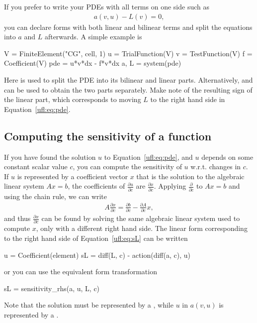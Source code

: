 If you prefer to write your PDEs with all terms on one side such as
\begin{align}\label{ufl:eq:pde}
a(v, u) - L(v) = 0,
\end{align}
you can declare forms with both linear and bilinear terms
and split the equations into $a$ and $L$ afterwards.
A simple example is
\begin{python}
V = FiniteElement("CG", cell, 1)
u = TrialFunction(V)
v = TestFunction(V)
f = Coefficient(V)
pde = u*v*dx - f*v*dx
a, L = system(pde)
\end{python}
Here  is used to split the PDE into its bilinear and
linear parts. Alternatively,  and  can be used
to obtain the two parts separately. Make note of the resulting sign
of the linear part, which corresponds to moving $L$ to the right
hand side in Equation~\eqref{ufl:eq:pde}.

\subsection{Computing the sensitivity of a function} \label{ufl:sec:sensitivity}
If you have found the solution $u$ to Equation~\eqref{ufl:eq:pde}, and
$u$ depends on some constant scalar value $c$, you can compute the
sensitivity of $u$ w.r.t. changes in $c$.  If $u$ is represented by a
coefficient vector $x$ that is the solution to the algebraic linear
system $A x = b$, the coefficients of $\frac{\partial u}{\partial c}$
are $\frac{\partial x}{\partial c}$.  Applying $\frac{\partial
}{\partial c}$ to $A x = b$ and using the chain rule, we can write
\begin{align}\label{ufl:eq:sL}
A \frac{\partial x}{\partial c} = \frac{\partial b}{\partial c} - \frac{\partial A}{\partial c} x,
\end{align}
and thus $\frac{\partial x}{\partial c}$ can be found by solving the
same algebraic linear system used to compute $x$, only with a
different right hand side.  The linear form corresponding to the right
hand side of Equation~\eqref{ufl:eq:sL} can be written
\begin{python}
u = Coefficient(element)
sL = diff(L, c) - action(diff(a, c), u)
\end{python}
or you can use the equivalent form transformation
\begin{python}
sL = sensitivity_rhs(a, u, L, c)
\end{python}
Note that the solution  must be represented by a
, while $u$ in $a(v, u)$ is represented
by a .


